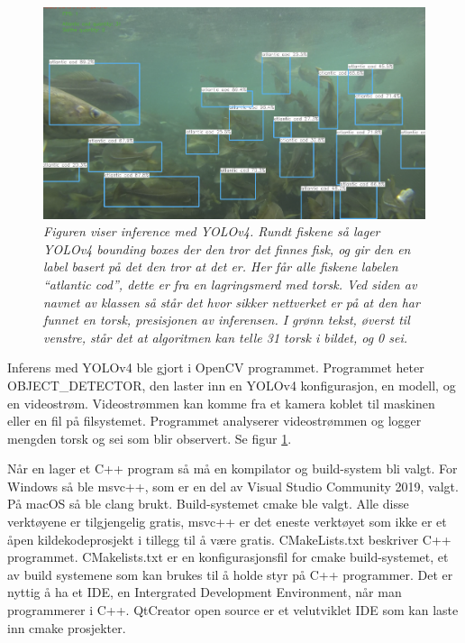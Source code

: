 \begin{figure}
\begin{center} 
\includegraphics[scale=0.35]{figures/inference_yolo}
\caption{\small \sl Figuren viser inference med YOLOv4. Rundt fiskene så lager YOLOv4 bounding boxes der den tror det finnes fisk, og gir den en label basert på det den tror at det er. Her får alle fiskene labelen ``atlantic cod'', dette er fra en lagringsmerd med torsk. Ved siden av navnet av klassen så står det hvor sikker nettverket er på at den har funnet en torsk, presisjonen av inferensen. I grønn tekst, øverst til venstre, står det at algoritmen kan telle 31 torsk i bildet, og 0 sei. \label{fig:yolo_inference}} 
\end{center} 
\end{figure} 

Inferens med YOLOv4 ble gjort i OpenCV programmet. Programmet heter OBJECT\_DETECTOR, den laster inn en YOLOv4 konfigurasjon, en modell, og en videostrøm. Videostrømmen kan komme fra et kamera koblet til maskinen eller en fil på filsystemet. Programmet analyserer videostrømmen og logger mengden torsk og sei som blir observert. Se figur \ref{fig:yolo_inference}.

Når en lager et C++ program så må en kompilator og build-system bli valgt. For Windows så ble msvc++, som er en del av Visual Studio Community 2019, valgt. På macOS så ble clang brukt. Build-systemet cmake ble valgt. Alle disse verktøyene er tilgjengelig gratis, msvc++ er det eneste verktøyet som ikke er et åpen kildekodeprosjekt i tillegg til å være gratis. CMakeLists.txt beskriver C++ programmet. CMakelists.txt er en konfigurasjonsfil for cmake build-systemet, et av build systemene som kan brukes til å holde styr på C++ programmer. Det er nyttig å ha et IDE, en Intergrated Development Environment, når man programmerer i C++. QtCreator open source er et velutviklet IDE som kan laste inn cmake prosjekter.

